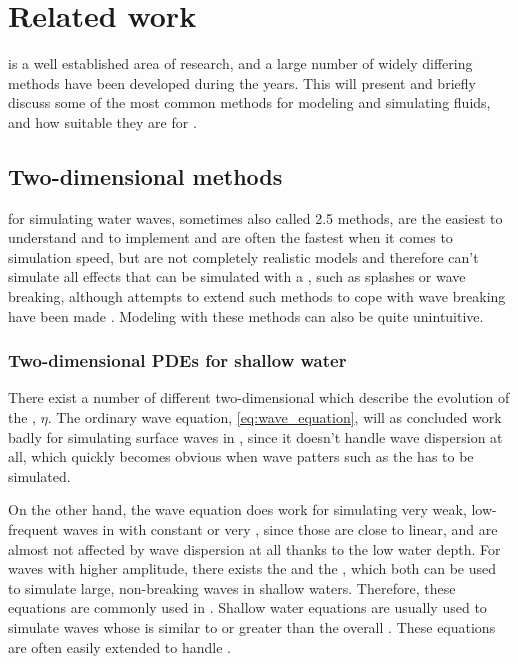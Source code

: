 \chapter{Related work}


\CFD is a well established area of research, and a large number of widely differing methods have been developed during the years. This \levelname will present and briefly discuss some of the most common methods for modeling and simulating fluids, and how suitable they are for \thisprojectwork.

\section{Two-dimensional methods}

 for simulating water waves, sometimes also called 2.5 methods, are the easiest to understand and to implement and are often the fastest when it comes to simulation speed, but are not completely realistic models and therefore can't simulate all effects that can be simulated with a , such as splashes or wave breaking, although attempts to extend such methods to cope with wave breaking have been made \citep[e.g.][]{Miklos2009}. Modeling \FSI with these methods can also be quite unintuitive.

\subsection{Two-dimensional PDEs for shallow water}

There exist a number of different two-dimensional \PDEs which describe the evolution of the , $\eta$. The ordinary wave equation, \eqref{eq:wave_equation}, will as concluded work badly for simulating surface waves in , since it doesn't handle wave dispersion at all, which quickly becomes obvious when wave patters such as the  has to be simulated.

On the other hand, the wave equation does work for simulating very weak, low-frequent waves in  with constant or very , since those are close to linear, and are almost not affected by wave dispersion at all thanks to the low water depth. For waves with higher amplitude, there exists the  and the , which both can be used to simulate large, non-breaking waves in shallow waters. Therefore, these equations are commonly used in \SWS. Shallow water equations are usually used to simulate waves whose \wavelength is similar to or greater than the overall  \citep{Thurey2006}. These equations are often easily extended to handle \FSI.

